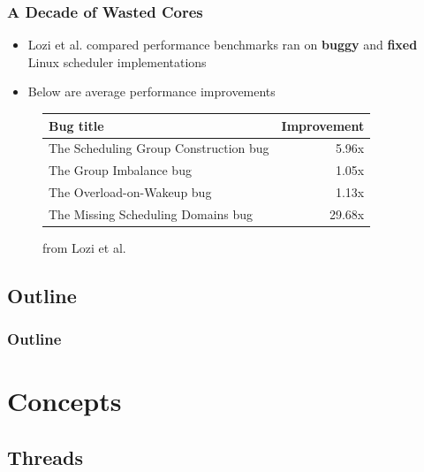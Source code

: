 \documentclass{beamer}
\newcommand{\linespace}{\vskip 0.25cm}
\begin{document}
\begin{frame}
\frametitle{A Decade of Wasted Cores}


\begin{itemize}

\item Lozi et al. compared performance benchmarks ran on \textbf{buggy} and \textbf{fixed} Linux scheduler implementations

\item Below are average performance improvements

\linespace
\end{itemize}
\begin{figure}
\begin{table}
	\centering
	\begin{tabular}{| l | r |}
	\hline
	\textbf{Bug title} & \textbf{Improvement} \\ \hline
	The Scheduling Group Construction bug & 5.96x \\ \hline
	The Group Imbalance bug & 1.05x \\ \hline
	The Overload-on-Wakeup bug & 1.13x\\ \hline
	The Missing Scheduling Domains bug & 29.68x \\ \hline
\end{tabular}
\end{table}
\caption*{from Lozi et al.~\cite{Lozi:2016}}
\end{figure}

\end{frame}

\subsection*{Outline}

\begin{frame}
  \frametitle{Outline}
  \tableofcontents[hideallsubsections]
\end{frame}

\section[Concepts]{Concepts}

\subsection[Threads]{Threads}
\end{document}
